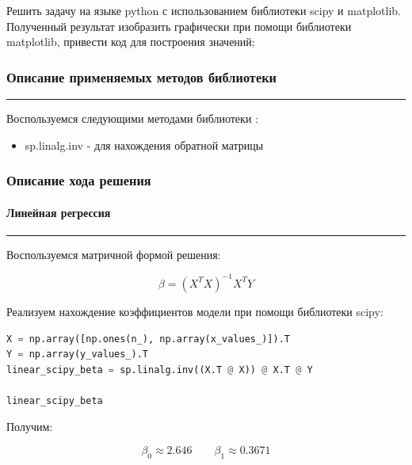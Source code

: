 \documentclass[a4paper, 14pt]{extarticle}
\begin{document}
Решить задачу на языке python с использованием библиотеки scipy и matplotlib. 
Полученный результат изобразить графически при помощи библиотеки matplotlib, 
привести код для построения значений;

\subsubsection*{{Описание применяемых методов библиотеки}}\vspace{-20pt}\rule{\linewidth}{0.1mm}

Воспользуемся следующими методами библиотеки :

\begin{itemize}
    \item sp.linalg.inv - для нахождения обратной матрицы
\end{itemize}

\subsubsection*{{Описание хода решения}}

\paragraph*{{Линейная регрессия}}\vspace{-20pt}\rule{\linewidth}{0.1mm}

Воспользуемся матричной формой решения:

\begin{equation*}
    \beta = (X^T X)^{-1} X^T Y
\end{equation*}

Реализуем нахождение коэффициентов модели при помощи библиотеки scipy:

\begin{center}
    \begin{lstlisting}[language=Python]
X = np.array([np.ones(n_), np.array(x_values_)]).T
Y = np.array(y_values_).T
linear_scipy_beta = sp.linalg.inv((X.T @ X)) @ X.T @ Y

linear_scipy_beta
    \end{lstlisting}
\end{center}

Получим:

\begin{equation*}
    \beta_0 \approx 2.646 \qquad \beta_1 \approx 0.3671
\end{equation*}
\end{document}
